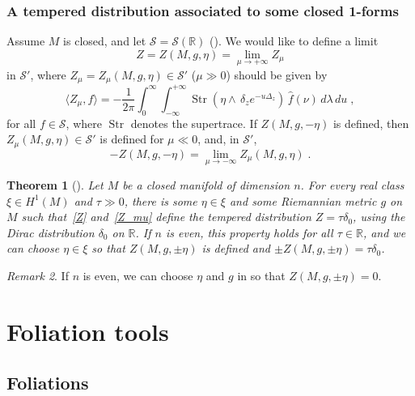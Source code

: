 \documentclass{memo-l}
\theoremstyle{plain}
\newtheorem{thm}{Theorem}[section]
\theoremstyle{definition}
\theoremstyle{remark}
\newtheorem{rem}[thm]{Remark}
\newcommand{\R}{\mathbb{R}}
\renewcommand{\SS}{\mathcal{S}}
\newcommand{\Str}{\operatorname{Str}}
\numberwithin{section}{chapter}
\numberwithin{equation}{section}%
\begin{document}
\subsection{A tempered distribution associated to some closed 1-forms}\label{ss: Z} 

Assume $M$ is closed, and let $\SS=\SS(\R)$ \index{$\SS$} (). We would like to define a limit 
\begin{equation}\label{Z}
Z=Z(M,g,\eta)=\lim_{\mu\to+\infty}Z_\mu
\end{equation}
in $\SS'$, where $Z_\mu=Z_\mu(M,g,\eta)\in\SS'$ ($\mu\gg0$) should be given by
\begin{equation}\label{Z_mu}
\langle Z_\mu,f\rangle=-\frac{1}{2\pi}\int_0^\infty\int_{-\infty}^{+\infty}\Str\left({\eta\wedge}\,\delta_ze^{-u\Delta_z}\right)
\,\hat f(\nu)\,d\lambda\,du\;,
\end{equation}
for all $f\in\SS$, where $\Str$ denotes the supertrace. If $Z(M,g,-\eta)$ is defined, then $Z_\mu(M,g,\eta)\in\SS'$ is defined for $\mu\ll0$, and, in $\SS'$,
\[
-Z(M,g,-\eta)=\lim_{\mu\to-\infty}Z_\mu(M,g,\eta)\;.
\]

\begin{thm}[{\cite[Theorems~1.1--1.4]{AlvKordyLeichtnam-ziomf}}]\label{t: Z}
Let $M$ be a closed manifold of dimension $n$. For every real class $\xi\in H^1(M)$ and $\tau\gg0$, there is some $\eta\in\xi$ and some Riemannian metric $g$ on $M$ such that~\eqref{Z} and~\eqref{Z_mu} define the tempered distribution $Z=\tau\delta_0$, using the Dirac distribution  $\delta_0$ on $\R$. If $n$ is even, this property holds for all $\tau\in\R$, and we can choose $\eta\in\xi$ so that $Z(M,g,\pm\eta)$ is defined and $\pm Z(M,g,\pm\eta)=\tau\delta_0$.
\end{thm}

\begin{rem}\label{r: Z}
If $n$ is even, we can choose $\eta$ and $g$ in  so that $Z(M,g,\pm\eta)=0$. 
\end{rem}




\chapter{Foliation tools}\label{ch: foln tools}

\section{Foliations}\label{s: folns}
\end{document}
